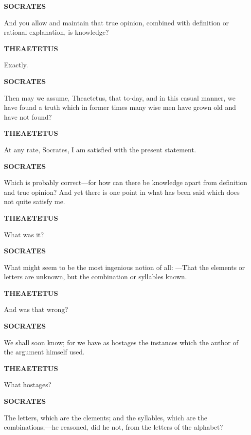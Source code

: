 \documentclass[11pt,letter]{article}
\begin{document}
\par \textbf{SOCRATES}
\par   And you allow and maintain that true opinion, combined with definition or rational explanation, is knowledge?

\par \textbf{THEAETETUS}
\par   Exactly.

\par \textbf{SOCRATES}
\par   Then may we assume, Theaetetus, that to-day, and in this casual manner, we have found a truth which in former times many wise men have grown old and have not found?

\par \textbf{THEAETETUS}
\par   At any rate, Socrates, I am satisfied with the present statement.

\par \textbf{SOCRATES}
\par   Which is probably correct—for how can there be knowledge apart from definition and true opinion? And yet there is one point in what has been said which does not quite satisfy me.

\par \textbf{THEAETETUS}
\par   What was it?

\par \textbf{SOCRATES}
\par   What might seem to be the most ingenious notion of all: —That the elements or letters are unknown, but the combination or syllables known.

\par \textbf{THEAETETUS}
\par   And was that wrong?

\par \textbf{SOCRATES}
\par   We shall soon know; for we have as hostages the instances which the author of the argument himself used.

\par \textbf{THEAETETUS}
\par   What hostages?

\par \textbf{SOCRATES}
\par   The letters, which are the clements; and the syllables, which are the combinations;—he reasoned, did he not, from the letters of the alphabet?
\end{document}

